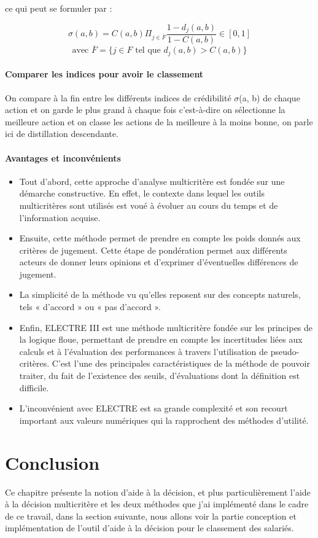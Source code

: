 ce qui peut se formuler par :

\[
\sigma(a, b) = C(a, b)\Pi_{j\in\overline{F}}\frac{1-d_{j}(a, b)}{1-C(a,b)} \in [0,1]
\]
\[\text{avec } \overline{F} = \text{\{}{j \in F  \text{ tel que } d_{j}(a, b) > C(a, b)}\text{\}}\]
\newpage
\paragraph{Comparer les indices pour avoir le classement}
On compare à la fin entre les différents indices de crédibilité $\sigma$(a, b) de chaque action et on  garde le plus grand à chaque fois c’est-à-dire on sélectionne la meilleure action et on classe les  actions de la meilleure à la moins bonne, on parle ici de distillation descendante.

\paragraph{Avantages et inconvénients}
\begin{itemize}
\item Tout d’abord, cette approche d’analyse multicritère est fondée sur une démarche constructive. En effet, le contexte dans lequel les outils multicritères sont utilisés est voué à évoluer au cours du temps et de l’information acquise.
\item Ensuite, cette méthode permet de prendre en compte les poids donnés aux critères de jugement. Cette étape de pondération permet aux différents acteurs de donner leurs opinions et d’exprimer d’éventuelles différences de jugement.
\item La simplicité de la méthode vu qu’elles reposent sur des concepts naturels, tels « d'accord » ou « pas d'accord ».
\item Enfin, ELECTRE III est une méthode multicritère fondée sur les principes de la logique floue, permettant de prendre en compte les incertitudes liées aux calculs et à l’évaluation des performances à travers l’utilisation de pseudo-critères. C’est l’une des principales caractéristiques de la méthode de pouvoir traiter, du fait de l’existence des seuils, d’évaluations dont la définition est difficile.
\item L’inconvénient avec ELECTRE est sa grande complexité et son recourt important aux valeurs numériques qui la rapprochent des méthodes d'utilité.
\end{itemize}



\section{Conclusion}
Ce chapitre présente la notion d’aide à la décision, et plus particulièrement l’aide à la décision multicritère et les deux méthodes que j’ai implémenté dans le cadre de ce travail, dans la section suivante, nous allons voir la partie conception et implémentation de l’outil d’aide à la décision pour le classement des salariés.








